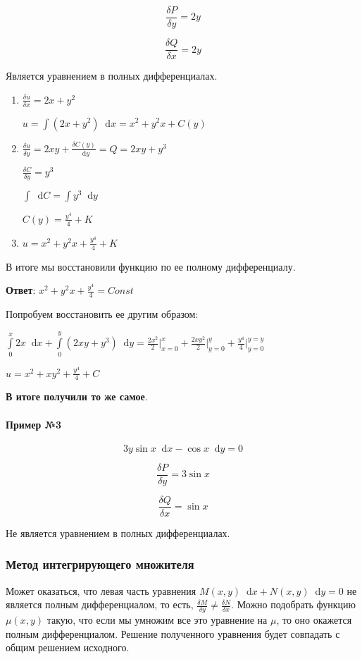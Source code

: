 \documentclass{article}
\newcommand*\diff{\mathop{}\!\mathrm{d}}
\begin{document}
$$\frac{\delta P}{\delta y} = 2y$$

$$\frac{\delta Q}{\delta x} = 2y$$

Является уравнением в полных дифференциалах.

\begin{enumerate}
    \item
    
    $\frac{\delta u}{\delta x} = 2x + y^2$

    $u = \int (2x + y^2) \diff x = x^2 + y^2 x + C(y)$
    \item 

    $\frac{\delta u}{\delta y} = 2xy + \frac{\delta C(y)}{\diff y} = Q = 2xy + y^3$

    $\frac{\delta C}{\delta y} = y^3$

    $\int \diff C = \int y^3 \diff y$

    $C(y) = \frac{y^4}{4} + K$
    \item $u = x^2 + y^2 x + \frac{y^4}{4} + K$
\end{enumerate}

В итоге мы восстановили функцию по ее полному дифференциалу.

\textbf{Ответ}: $x^2 + y^2 x + \frac{y^4}{4} = Const$

Попробуем восстановить ее другим образом:

$\int\limits_{0}^{x} 2x \diff x + \int\limits_{0}^{y} (2xy + y^3) \diff y = \frac{2x^2}{2} \bigg|_{x = 0}^{x} + \frac{2xy^2}{2} \bigg|_{y = 0}^{y} + \frac{y^4}{4} \bigg|_{y = 0}^{y = y}$

$u = x^2 + xy^2 + \frac{y^4}{4} + C$

\textbf{В итоге получили то же самое}.

\paragraph{Пример №3}

$$3y \sin x \diff x - \cos x \diff y = 0$$

$$\frac{\delta P}{\delta y} = 3 \sin x$$

$$\frac{\delta Q}{\delta x} = \sin x$$

Не является уравнением в полных дифференциалах.

\subsubsection{Метод интегрирующего множителя}

Может оказаться, что левая часть уравнения $M(x, y) \diff x + N(x, y) \diff y = 0$ не является полным дифференциалом, то есть, $\frac{\delta M}{\delta y} \ne \frac{\delta N}{\delta x}$. Можно подобрать функцию $\mu (x, y)$ такую, что если мы умножим все это уравнение на $\mu$, то оно окажется полным дифференциалом. Решение полученного уравнения будет совпадать с общим решением исходного.
\end{document}
